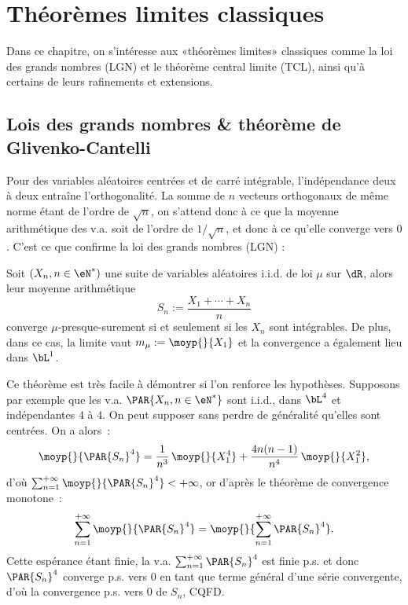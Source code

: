%
%
\chapter{Théorèmes limites classiques}
%
%

Dans ce chapitre, on s'intéresse aux «théorèmes limites» classiques comme la
loi des grands nombres (LGN) et le théorème central limite (TCL), ainsi qu'à
certains de leurs rafinements et extensions.

%
\section{Lois des grands nombres \& théorème de Glivenko-Cantelli}\label{se:lgn}
%

Pour des variables aléatoires centrées et de carré intégrable, l'indépendance
deux à deux entraîne l'orthogonalité. La somme de $n$ vecteurs orthogonaux de
même norme étant de l'ordre de $\sqrt{n}$, on s'attend donc à ce que la
moyenne arithmétique des v.a. soit de l'ordre de $1/\sqrt{n}$, et donc à ce
qu'elle converge vers $0$. C'est ce que confirme la loi des grands nombres
(LGN) :

\begin{thm}
  Soit $(X_n,n\in\eN^*)$ une suite de variables aléatoires i.i.d. de loi $\mu$ sur
  $\dR$, alors leur moyenne arithmétique 
  $$
  S_n:=\frac{X_1+\cdots+X_n}{n}
  $$
  converge $\mu$-presque-surement si et seulement si les $X_n$ sont
  intégrables. De plus, dans ce cas, la limite vaut $m_\mu:=\moyp{}{X_1}$ et la
  convergence a également lieu dans $\bL^1$.
\end{thm}

Ce théorème est très facile à démontrer si l'on renforce les hypothèses.
Supposons par exemple que les v.a. $\PAR{X_n,n\in\eN^*}$ sont i.i.d., dans
$\bL^4$ et indépendantes $4$ à $4$. On peut supposer sans perdre de généralité
qu'elles sont centrées. On a alors~:
$$
\moyp{}{\PAR{S_n}^4}=\frac{1}{n^3}\,\moyp{}{X_1^4}+\frac{4n(n-1)}{n^4}\,\moyp{}{X_1^2},
$$
d'où $\sum_{n=1}^{+\infty}\moyp{}{\PAR{S_n}^4}<+\infty$, or d'après le théorème
de convergence monotone~:
$$
\sum_{n=1}^{+\infty}\moyp{}{\PAR{S_n}^4}
=\moyp{}{\sum_{n=1}^{+\infty}\PAR{S_n}^4}.
$$
Cette espérance étant finie, la v.a. $\sum_{n=1}^{+\infty}\PAR{S_n}^4$ est
finie p.s. et donc $\PAR{S_n}^4$ converge p.s. vers $0$ en tant que terme
général d'une série convergente, d'où la convergence p.s. vers $0$ de $S_n$,
CQFD.

